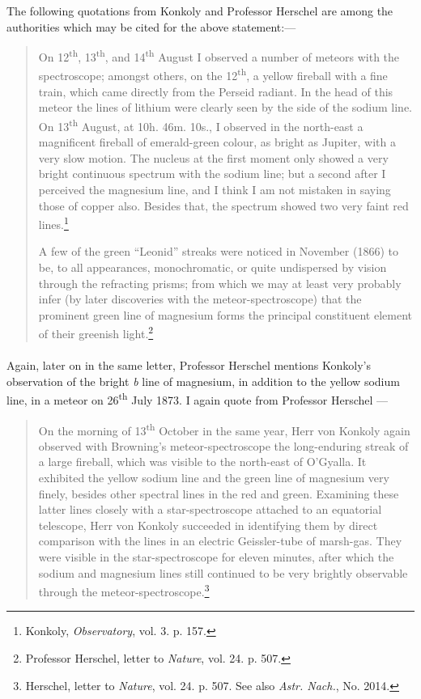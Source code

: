 \documentclass[a4paper, 12pt, oneside, polutonikogreek, english]{article}
\begin{document}
The following quotations from Konkoly and Professor Herschel are among the authorities which may be cited for the above statement:---
\begin{quotation}
On 12\textsuperscript{th}, 13\textsuperscript{th}, and 14\textsuperscript{th} August I observed a number of meteors with the spectroscope; amongst others, on the 12\textsuperscript{th}, a yellow fireball with a fine train, which came directly from the Perseid radiant. In the head of this meteor the lines of lithium were clearly seen by the side of the sodium line. On 13\textsuperscript{th} August, at 10h. 46m. 10s., I observed in the north-east a magnificent fireball of emerald-green colour, as bright as Jupiter, with a very slow motion. The nucleus at the first moment only showed a very bright continuous spectrum with the sodium line; but a second after I perceived the magnesium line, and I think I am not mistaken in saying those of copper also. Besides that, the spectrum showed two very faint red lines.\footnote{Konkoly, \emph{Observatory}, vol. 3. p. 157.}

A few of the green ``Leonid'' streaks were noticed in November (1866) to be, to all appearances, monochromatic, or quite undispersed by vision through the refracting prisms; from which we may at least very probably infer (by later discoveries with the meteor-spectroscope) that the prominent green line of magnesium forms the principal constituent element of their greenish light.\footnote{Professor Herschel, letter to \emph{Nature}, vol. 24. p. 507.}
\end{quotation}
\paragraph{}
Again, later on in the same letter, Professor Herschel mentions Konkoly's observation of the bright \emph{b} line of magnesium, in addition to the yellow sodium line, in a meteor on 26\textsuperscript{th} July 1873. I again quote from Professor Herschel ---
\begin{quotation}
On the morning of 13\textsuperscript{th} October in the same year, Herr von Konkoly again observed with Browning's meteor-spectroscope the long-enduring streak of a large fireball, which was visible to the north-east of O'Gyalla. It exhibited the yellow sodium line and the green line of magnesium very finely, besides other spectral lines in the red and green. Examining these latter lines closely with a star-spectroscope attached to an equatorial telescope, Herr von Konkoly succeeded in identifying them by direct comparison with the lines in an electric Geissler-tube of marsh-gas. They were visible in the star-spectroscope for eleven minutes, after which the sodium and magnesium lines still continued to be very brightly observable through the meteor-spectroscope.\footnote{Herschel, letter to \emph{Nature}, vol. 24. p. 507. See also \emph{Astr. Nach.}, No. 2014.}
\end{quotation}
\end{document}
